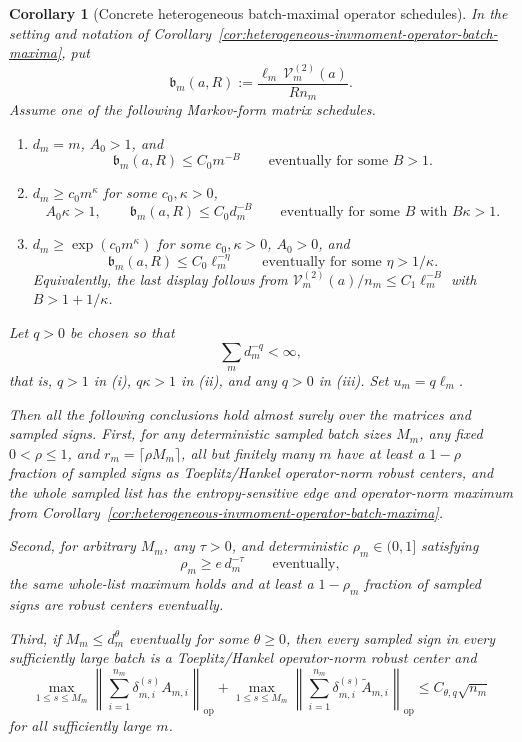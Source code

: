 \documentclass[11pt]{amsart}
\numberwithin{equation}{section}
\newtheorem{corollary}[theorem]{Corollary}
\theoremstyle{definition}
\theoremstyle{remark}
\newcommand{\op}{\mathrm{op}}
\begin{document}
\begin{corollary}[Concrete heterogeneous batch-maximal operator schedules]
\label{cor:heterogeneous-invmoment-operator-batch-maxima-schedules}
In the setting and notation of
Corollary~\ref{cor:heterogeneous-invmoment-operator-batch-maxima}, put
\[
  \mathfrak b_m(a,R):=
  \frac{\ell_m\,\mathcal V_m^{(2)}(a)}{R n_m}.
\]
Assume one of the following Markov-form matrix schedules.
\begin{enumerate}[label=\textup{(\roman*)},leftmargin=2.2em]
\item \(d_m=m\), \(A_0>1\), and
\[
  \mathfrak b_m(a,R)\le C_0m^{-B}
  \qquad\text{eventually for some }B>1.
\]
\item \(d_m\ge c_0m^\kappa\) for some \(c_0,\kappa>0\),
\[
  A_0\kappa>1,
  \qquad
  \mathfrak b_m(a,R)\le C_0d_m^{-B}
  \qquad\text{eventually for some }B\text{ with }B\kappa>1.
\]
\item \(d_m\ge\exp(c_0m^\kappa)\) for some \(c_0,\kappa>0\), \(A_0>0\), and
\[
  \mathfrak b_m(a,R)\le C_0\ell_m^{-\eta}
  \qquad\text{eventually for some }\eta>1/\kappa .
\]
Equivalently, the last display follows from
\(\mathcal V_m^{(2)}(a)/n_m\le C_1\ell_m^{-B}\) with
\(B>1+1/\kappa\).
\end{enumerate}
Let \(q>0\) be chosen so that
\[
  \sum_m d_m^{-q}<\infty ,
\]
that is, \(q>1\) in \textup{(i)}, \(q\kappa>1\) in \textup{(ii)}, and any
\(q>0\) in \textup{(iii)}.  Set \(u_m=q\ell_m\).

Then all the following conclusions hold almost surely over the matrices and
sampled signs.  First, for any deterministic sampled batch sizes \(M_m\), any
fixed \(0<\rho\le1\), and \(r_m=\lceil\rho M_m\rceil\), all but finitely many
\(m\) have at least a \(1-\rho\) fraction of sampled signs as Toeplitz/Hankel
operator-norm robust centers, and the whole sampled list has the
entropy-sensitive edge and operator-norm maximum from
Corollary~\ref{cor:heterogeneous-invmoment-operator-batch-maxima}.

Second, for arbitrary \(M_m\), any \(\tau>0\), and deterministic
\(\rho_m\in(0,1]\) satisfying
\[
  \rho_m\ge e\,d_m^{-\tau}
  \qquad\text{eventually},
\]
the same whole-list maximum holds and at least a \(1-\rho_m\) fraction of sampled
signs are robust centers eventually.

Third, if \(M_m\le d_m^\theta\) eventually for some \(\theta\ge0\), then every
sampled sign in every sufficiently large batch is a Toeplitz/Hankel
operator-norm robust center and
\[
  \max_{1\le s\le M_m}
  \left\|\sum_{i=1}^{n_m}\delta_{m,i}^{(s)}A_{m,i}\right\|_{\op}
  +
  \max_{1\le s\le M_m}
  \left\|\sum_{i=1}^{n_m}\delta_{m,i}^{(s)}\widetilde A_{m,i}\right\|_{\op}
  \le C_{\theta,q}\sqrt{n_m}
\]
for all sufficiently large \(m\).


\end{corollary}
\end{document}
